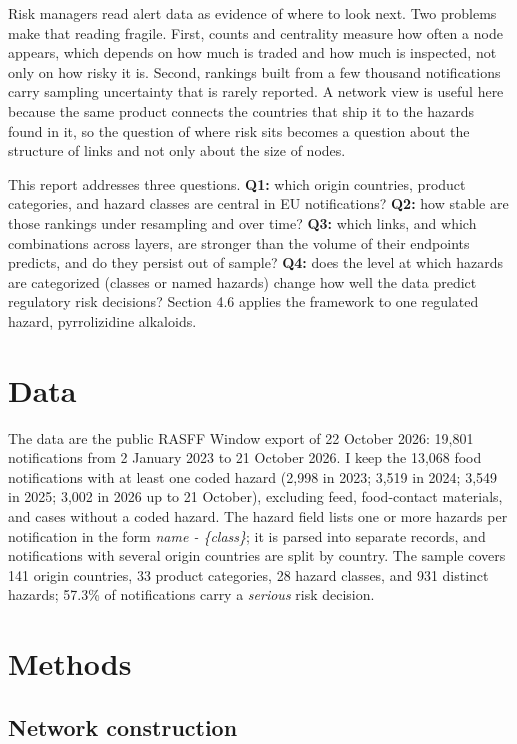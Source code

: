 \documentclass[11pt]{article}
\begin{document}
Risk managers read alert data as evidence of where to look next. Two problems make that reading fragile. First, counts and centrality measure how often a node appears, which depends on how much is traded and how much is inspected, not only on how risky it is. Second, rankings built from a few thousand notifications carry sampling uncertainty that is rarely reported. A network view is useful here because the same product connects the countries that ship it to the hazards found in it, so the question of where risk sits becomes a question about the structure of links and not only about the size of nodes.

This report addresses three questions. \textbf{Q1:} which origin countries, product categories, and hazard classes are central in EU notifications? \textbf{Q2:} how stable are those rankings under resampling and over time? \textbf{Q3:} which links, and which combinations across layers, are stronger than the volume of their endpoints predicts, and do they persist out of sample? \textbf{Q4:} does the level at which hazards are categorized (classes or named hazards) change how well the data predict regulatory risk decisions? Section 4.6 applies the framework to one regulated hazard, pyrrolizidine alkaloids.

\section{Data}

The data are the public RASFF Window export of 22 October 2026: 19,801 notifications from 2 January 2023 to 21 October 2026. I keep the 13,068 food notifications with at least one coded hazard (2,998 in 2023; 3,519 in 2024; 3,549 in 2025; 3,002 in 2026 up to 21 October), excluding feed, food-contact materials, and cases without a coded hazard. The hazard field lists one or more hazards per notification in the form \emph{name - \{class\}}; it is parsed into separate records, and notifications with several origin countries are split by country. The sample covers 141 origin countries, 33 product categories, 28 hazard classes, and 931 distinct hazards; 57.3\% of notifications carry a \emph{serious} risk decision.

\section{Methods}

\subsection{Network construction}
\end{document}
